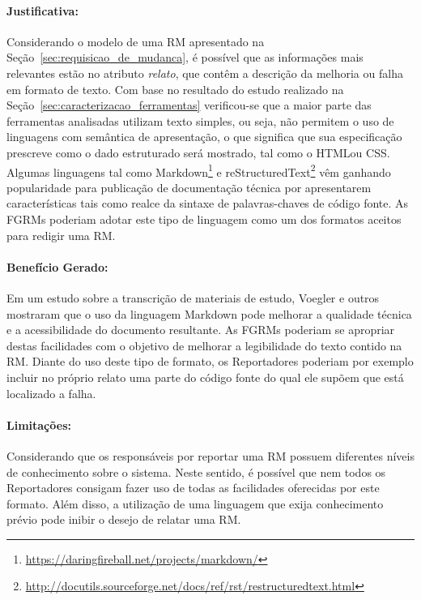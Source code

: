 \paragraph{Justificativa:}
\label{par:justificativa_s06}

Considerando o modelo de uma RM apresentado na
Seção~\ref{sec:requisicao_de_mudanca}, é possível que as informações mais
relevantes estão no atributo \textit{relato}, que contêm a descrição da melhoria
ou falha em formato de texto. Com base no resultado do estudo realizado na
Seção~\ref{sec:caracterizacao_ferramentas} verificou-se que a maior parte das
ferramentas analisadas utilizam texto simples, ou seja, não permitem o uso de
linguagens com semântica de apresentação, o que significa que sua especificação
prescreve como o dado estruturado será mostrado, tal como o HTML\@  ou CSS\@.
Algumas linguagens tal como
Markdown\footnote{\url{https://daringfireball.net/projects/markdown/}} e
reStructuredText\footnote{\url{http://docutils.sourceforge.net/docs/ref/rst/restructuredtext.html}}
vêm ganhando popularidade para publicação de documentação técnica por
apresentarem características tais como realce da sintaxe de palavras-chaves de
código fonte. As FGRMs poderiam adotar este tipo de linguagem como um dos
formatos aceitos para redigir uma RM\@.

\paragraph{Benefício Gerado:}
\label{par:papéis_afetados_s06}

Em um estudo sobre a transcrição de materiais de estudo, Voegler e
outros~\cite{voegler2014markdown} mostraram que o uso da linguagem Markdown pode
melhorar a qualidade técnica e a acessibilidade do documento resultante. As
FGRMs poderiam se apropriar destas facilidades com o objetivo de melhorar a
legibilidade do texto contido na RM\@. Diante do uso deste tipo de formato, os
Reportadores poderiam por exemplo incluir no próprio relato uma parte do código
fonte do qual ele supõem que está localizado a falha.

\paragraph{Limitações:}
\label{par:limitacoes_s06}

Considerando que os responsáveis por reportar uma RM possuem diferentes níveis
de conhecimento sobre o sistema. Neste sentido, é possível que nem todos os
Reportadores consigam fazer uso de todas as facilidades oferecidas por este
formato. Além disso, a utilização de uma linguagem que exija conhecimento
prévio pode inibir o desejo de relatar uma RM\@.

